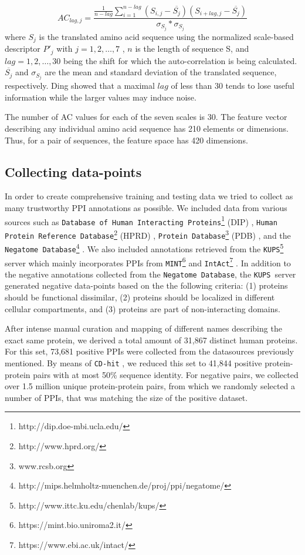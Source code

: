 \documentclass[3p,times,twocolumn]{elsarticle}
\newcommand{\nega}{\texttt{Negatome Database}}
\newcommand{\kups}{\texttt{KUPS}}
\begin{document}
\begin{equation}
AC_{lag, j} = \frac {\frac{1}{n-lag} \sum^{n-lag}_{i=1} ( S_{i,j} - \overline{S_j}) (S_{i+lag,j} - \overline{S_j})} { \sigma_{S_j} * \sigma_{S_j} }
\end{equation}
where $S_j$ is the translated amino acid sequence using the normalized
scale-based descriptor $P'_j$ with $j = 1, 2, \dots, 7$ , $n$ is the
length of sequence S, and $lag = 1, 2, \dots, 30$  being the shift for
which the auto-correlation is being calculated. $\overline{S_j}$ and
$\sigma_{S_j}$ are the mean and standard deviation of the translated
sequence, respectively. Ding \cite{Ding:2016} showed that a maximal
$lag$ of less than 30 tends to lose useful information while the
larger values may induce noise. 

The number of AC values for each of the seven scales is 30. 
The feature vector describing any individual amino acid sequence has 210 elements or dimensions.
Thus, for a pair of sequences, the feature space has 420 dimensions. 


\subsection{Collecting data-points}
In order to create comprehensive training and testing data we tried to
collect as many trustworthy PPI annotations as possible. We included
data from various sources such as \texttt{Database of Human
  Interacting Proteins}\footnote{http://dip.doe-mbi.ucla.edu/} (DIP)
\cite{Salwinski:2004}, \texttt{Human Protein Reference
  Database}\footnote{http://www.hprd.org/} (HPRD)
\cite{Keshava_Prasad:2009}, \texttt{Protein
  Database}\footnote{www.rcsb.org} (PDB) \cite{Berman:2000}, and the
\nega\footnote{http://mips.helmholtz-muenchen.de/proj/ppi/negatome/}
\cite{Blohm:2014}. We also included annotations retrieved from the
\kups \footnote{http://www.ittc.ku.edu/chenlab/kups/}   server
\cite{Chen:2011} which mainly incorporates PPIs from
\texttt{MINT}\footnote{https://mint.bio.uniroma2.it/}
\cite{Licata:2012} and
\texttt{IntAct}\footnote{https://www.ebi.ac.uk/intact/}
\cite{Orchard:2014}. In addition to the negative annotations collected
from the \nega, the \kups\ server generated negative data-points based
on the the following criteria: (1) proteins should be functional
dissimilar, (2) proteins should be localized in different cellular
compartments, and (3) proteins are part of non-interacting domains. 

After intense manual curation and mapping of different names describing
the exact same protein, we derived a total amount of 31,867 distinct
human proteins. For this set, 73,681 positive PPIs were collected
from the datasources previously mentioned. By means of \texttt{CD-hit}
\cite{Li:2006, Fu:2012}, we reduced this set to 41,844 positive
protein-protein pairs with at most 50\% sequence identity. For
negative pairs, we collected over 1.5 million unique protein-protein
pairs, from which we randomly selected a number of PPIs, that was
matching the size of the positive dataset.
\end{document}
